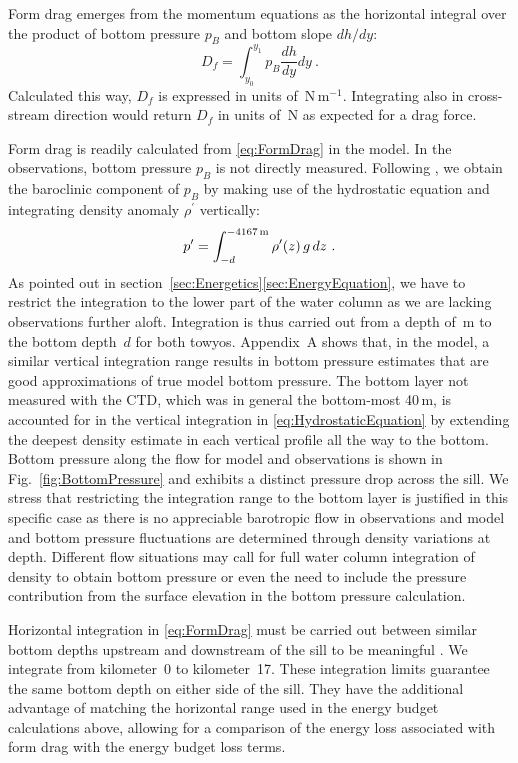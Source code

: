 \documentclass{ametsocV6.1}
\begin{document}
Form drag emerges from the momentum equations \citep[e.g.][]{maccreadyetal03} as the horizontal integral over the product of bottom pressure $p_B$ and bottom slope $dh/dy$:
\begin{equation}
    D_f = \int_{y_0}^{y_1} p_B \frac{dh}{dy} dy\ .
\label{eq:FormDrag}
\end{equation}
Calculated this way, $D_f$ is expressed in units of~N\,m$^{-1}$.
Integrating also in cross-stream direction would return $D_f$ in units of~N as expected for a drag force.

Form drag is readily calculated from \eqref{eq:FormDrag} in the model.
In the observations, bottom pressure $p_B$ is not directly measured.
Following \citet{warneretal13}, we obtain the baroclinic component of $p_B$ by making use of the hydrostatic equation and integrating density anomaly $\rho^\prime$ vertically:
\begin{equation}
    p^\prime = \int_{-d}^{-4167\,\mathrm{m}} \rho^\prime(z)\, g\, dz\ .
\label{eq:HydrostaticEquation}
\end{equation}
As pointed out in section~\ref{sec:Energetics}\ref{sec:EnergyEquation}, we have to restrict the integration to the lower part of the water column as we are lacking observations further aloft.
Integration is thus carried out from a depth of \TyIntStartDepth\,m to the bottom depth~$d$ for both towyos.
Appendix~A shows that, in the model, a similar vertical integration range results in bottom pressure estimates that are good approximations of true model bottom pressure.
The bottom layer not measured with the CTD, which was in general the bottom-most 40\,m, is accounted for in the vertical integration in \eqref{eq:HydrostaticEquation} by extending the deepest density estimate in each vertical profile all the way to the bottom.
Bottom pressure along the flow for model and observations is shown in Fig.~\ref{fig:BottomPressure} and exhibits a distinct pressure drop across the sill.
We stress that restricting the integration range to the bottom layer is justified in this specific case as there is no appreciable barotropic flow in observations and model and bottom pressure fluctuations are determined through density variations at depth.
Different flow situations may call for full water column integration of density to obtain bottom pressure or even the need to include the pressure contribution from the surface elevation in the bottom pressure calculation.

Horizontal integration in \eqref{eq:FormDrag} must be carried out between similar bottom depths upstream and downstream of the sill to be meaningful \citep[e.g.][]{nashmoum01}.
We integrate from kilometer~0 to kilometer~17.
These integration limits guarantee the same bottom depth on either side of the sill.
They have the additional advantage of matching the horizontal range used in the energy budget calculations above, allowing for a comparison of the energy loss associated with form drag with the energy budget loss terms.
\end{document}
